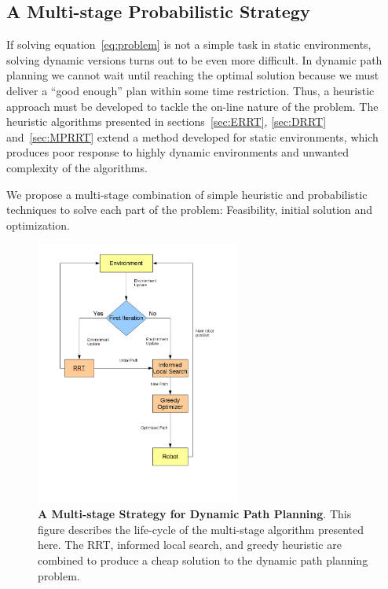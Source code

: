 \subsection{A Multi-stage Probabilistic Strategy}

If solving equation~\ref{eq:problem} is not a simple task in static environments,
solving dynamic versions turns out to be even more difficult. In dynamic path planning
we cannot wait until reaching the optimal solution because we must deliver
a ``good enough'' plan within some time restriction. Thus, a heuristic approach
must be developed to tackle the on-line nature of the problem. The heuristic
algorithms presented in sections~\ref{sec:ERRT}, \ref{sec:DRRT} and~\ref{sec:MPRRT}
extend a method developed for static environments, which produces poor response
to highly dynamic environments and unwanted complexity of the algorithms.

We propose a multi-stage combination of simple heuristic and probabilistic techniques
to solve each part of the problem: Feasibility, initial solution and optimization.

\begin{figure}[ht]
\begin{center}
\includegraphics[width=0.6\textwidth]{images/diag}
\caption[A Multi-stage Strategy for Dynamic Path Planning]{\textbf{A Multi-stage Strategy for Dynamic Path Planning}. This figure describes
the life-cycle of the multi-stage algorithm presented here. The RRT, informed local search, and greedy heuristic are combined
to produce a cheap solution to the dynamic path planning problem.}
\label{fig:diag}
\end{center}
\end{figure}


